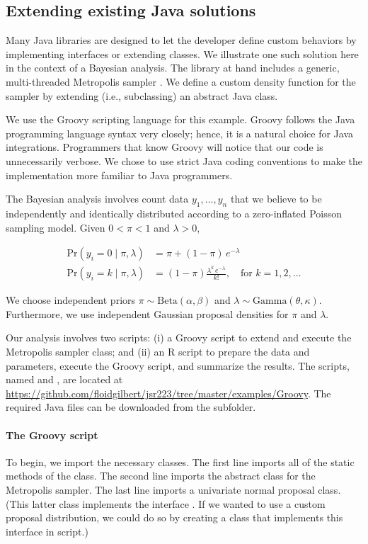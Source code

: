 \hypertarget{extending-existing-java-solutions}{}
\subsection{Extending existing Java solutions}

Many Java libraries are designed to let the developer define custom behaviors by implementing interfaces or extending classes. We illustrate one such solution here in the context of a Bayesian analysis. The library at hand includes a generic, multi-threaded Metropolis sampler \citep{metropolis}. We define a custom density function for the sampler by extending (i.e., subclassing) an abstract Java class.

We use the Groovy scripting language for this example. Groovy follows the Java programming language syntax very closely; hence, it is a natural choice for Java integrations. Programmers that know Groovy will notice that our code is unnecessarily verbose. We chose to use strict Java coding conventions to make the implementation more familiar to Java programmers.

The Bayesian analysis involves count data $y_1,\dots,y_n$ that we believe to be independently and identically distributed according to a zero-inflated Poisson sampling model. Given $0 < \pi < 1$ and $\lambda > 0$,

\begin{align*}
\text{Pr}(y_i = 0 \mid \pi, \lambda) &= \pi + (1-\pi) \, e^{-\lambda} \\
\text{Pr}(y_i = k \mid \pi, \lambda) &= (1  -\pi) \frac{\lambda^k \, e^{-\lambda}}{k!}, \quad \text{for } k = 1, 2, \ldots
\end{align*}

We choose independent priors $\pi \sim \text{Beta}(\alpha,\beta)$ and $\lambda \sim \text{Gamma}(\theta,\kappa)$. Furthermore, we use independent Gaussian proposal densities for $\pi$ and $\lambda$.

Our analysis involves two scripts: (i) a Groovy script to extend and execute the Metropolis sampler class; and (ii) an R script to prepare the data and parameters, execute the Groovy script, and summarize the results. The scripts, named  and , are located at \url{https://github.com/floidgilbert/jsr223/tree/master/examples/Groovy}. The required Java files can be downloaded from the  subfolder.

\paragraph{The Groovy script} To begin, we import the necessary classes. The first line imports all of the static methods of the  class. The second line imports the abstract class for the Metropolis sampler. The last line imports a univariate normal proposal class. (This latter class implements the interface . If we wanted to use a custom proposal distribution, we could do so by creating a class that implements this interface in script.)

